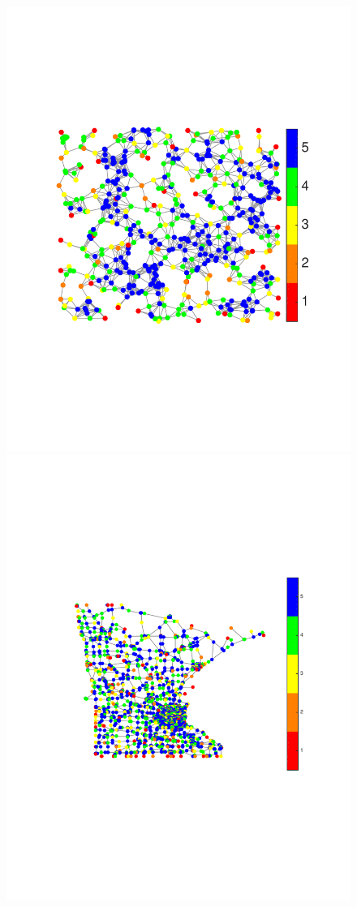 \documentclass[journal, 10pt]{IEEEtran}
\begin{document}
\begin{figure}[tb]
\begin{minipage}[m]{0.05\linewidth}
\centerline{\includegraphics[width=.9\linewidth]{fig_uniq_part_col2}}
\end{minipage}
\hspace{.003\linewidth}
\begin{minipage}[m]{0.46\linewidth}
\centerline{\includegraphics[width=\linewidth]{fig_uniq_part_minn4}}

\end{minipage}
\end{figure}
\end{document}
